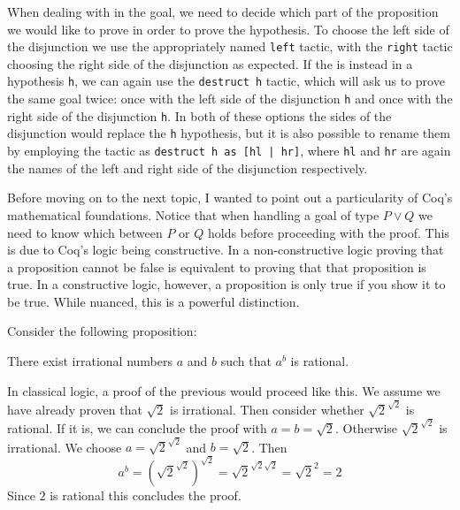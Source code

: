 When dealing with \texttt{\/} in the goal, we need to decide which part of the proposition we would
like to prove in order to prove the hypothesis. To choose the left side of the disjunction we use the
appropriately named \texttt{left} tactic, with the \texttt{right} tactic choosing the
right side of the disjunction as expected. If the \texttt{\/} is instead in a hypothesis 
\texttt{h}, we can again use the \texttt{destruct h} tactic, which will ask us to
prove the same goal twice: once with the left side of the disjunction \texttt{h} and once with
the right side of the disjunction \texttt{h}. In both of these options the sides of the 
disjunction would replace the \texttt{h} hypothesis, but it is also possible to rename them 
by employing the tactic as \texttt{destruct h as [hl | hr]}, where \texttt{hl} and
\texttt{hr} are again the names of the left and right side of the disjunction respectively.

Before moving on to the next topic, I wanted to point out a particularity of Coq's mathematical
foundations. Notice that when handling a goal of type $P \vee Q$ we need to know which between $P$ or $Q$
holds before proceeding with the proof. This is due to Coq's logic being constructive. In a 
non-constructive logic proving that a proposition cannot be false is equivalent to proving that that
proposition is true. In a constructive logic, however, a proposition is only true if you show it to be
true. While nuanced, this is a powerful distinction.

Consider the following proposition:
\begin{center}
There exist irrational numbers $a$ and $b$ such that $a^b$ is rational.
\end{center}
In classical logic, a proof of the previous would proceed like this. We assume we have already proven that
$\sqrt{2}$ is irrational. Then consider whether $\sqrt{2}^{\sqrt{2}}$ is rational. If it is, we can conclude
the proof with $a = b = \sqrt{2}$. Otherwise $\sqrt{2}^{\sqrt{2}}$ is irrational. We choose $a = \sqrt{2}^
{\sqrt{2}}$ and $b = \sqrt{2}$. Then
$$
a^b = \left(\sqrt{2}^{\sqrt{2}}\right)^{\sqrt{2}} = \sqrt{2}^{\sqrt{2}\sqrt{2}} = \sqrt{2} ^ 2 = 2
$$
\noindent Since $2$ is rational this concludes the proof.

